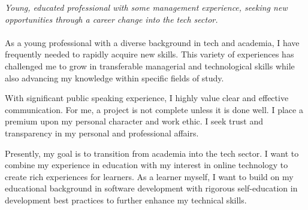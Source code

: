 
\vspace{-1.3em} %

\begin{multicols}{2}  %
\noindent \textit{Young, educated professional with some management experience, seeking new opportunities through a career change into the tech sector.}\\\\



As a young professional with a diverse background in tech and academia, I have frequently needed to rapidly acquire new skills. This variety of experiences has challenged me to grow in transferable managerial and technological skills while also advancing my knowledge within specific fields of study.


With significant public speaking experience, I highly value clear and effective communication. For me, a project is not complete unless it is done well. I place a premium upon my personal character and work ethic. I seek trust and transparency in my personal and professional affairs.


Presently, my goal is to transition from academia into the tech sector. I want to combine my experience in education with my interest in online technology to create rich experiences for learners. As a learner myself, I want to build on my educational background in software development with rigorous self-education in development best practices to further enhance my technical skills.


\end{multicols}

